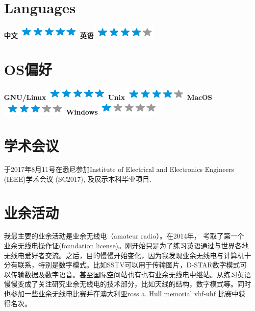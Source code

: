 \documentclass[]{friggeri-cv}
\begin{document}
\begin{aside}
  \section{Languages}
    \textbf{中文}\includegraphics[scale=0.40]{img/5stars.png}
    \textbf{英语}\includegraphics[scale=0.40]{img/4stars.png}
    ~
  \section{OS偏好}
    \textbf{GNU/Linux}\includegraphics[scale=0.40]{img/5stars.png}
    \textbf{Unix}\includegraphics[scale=0.40]{img/4stars.png}
    \textbf{MacOS}\includegraphics[scale=0.40]{img/3stars.png}
    \textbf{Windows}\includegraphics[scale=0.40]{img/1stars.png}
    ~
\end{aside}

\section{学术会议}
于2017年8月11号在悉尼参加Institute of Electrical and Electronics Engineers (IEEE)学术会议 (SC2017), 及展示本科毕业项目.

\section{业余活动}
我最主要的业余活动是业余无线电（amateur radio）。在2014年，
考取了第一个业余无线电操作证(foundation license)。刚开始只是为了练习英语通过与世界各地无线电爱好者交流。之后，目的慢慢开始变化，因为我发现业余无线电与计算机十分有联系，特别是数字模式。比如SSTV可以用于传输图片，D-STAR数字模式可以传输数据及数字语音。甚至国际空间站也有也有业余无线电中继站。从练习英语慢慢变成了关注研究业余无线电的技术部分，比如天线的结构，数字模式等。同时也参加一些业余无线电比赛并在澳大利亚ross a. Hull memorial vhf-uhf 比赛中获得名次。
\end{document}

